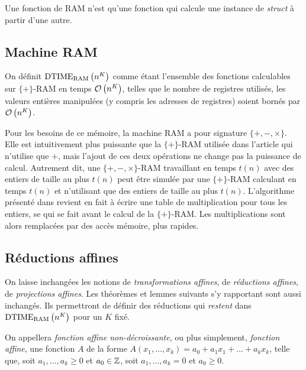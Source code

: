 		Une fonction de RAM n'est qu'une fonction qui calcule une instance de \emph{struct} à partir d'une autre. 
		
		
		
		\subsection{Machine RAM} %
		\label{subsec:machine_RAM}
		
		\begin{definition}
			\label{def:temps_poly_RAM}
			On définit $\text{DTIME}_{\text{RAM}}\left( n^K \right)$ comme étant l'ensemble des fonctions calculables sur $\{+\}$-RAM en temps $\mathcal{O}\left( n^K \right)$, telles que le nombre de registres utilisés, les valeurs entières manipulées (y compris les adresses de registres) soient bornés par $\mathcal{O}\left( n^K \right)$.
		\end{definition}
		
		Pour les besoins de ce mémoire, la machine RAM a pour signature $\{+ , -, \times \}$. Elle est intuitivement plus puissante que la $\{+\}$-RAM utilisée dans l'article \cite{Grandjean1994} qui n'utilise que $+$, mais l'ajout de ces deux opérations ne change pas la puissance de calcul. Autrement dit, une $\{+ , -, \times \}$-RAM travaillant en temps $t(n)$ avec des entiers de taille au plus $t(n)$ peut être simulée par une $\{+\}$-RAM calculant en temps $t(n)$ et n'utilisant que des entiers de taille au plus $t(n)$. 
		L'algorithme présenté dans \cite{GrandjeanSchwentick2002} revient en fait à écrire une table de multiplication pour tous les entiers, se qui se fait avant le calcul de la $\{+\}$-RAM. Les multiplications sont alors remplacées par des accès mémoire, plus rapides.
		
		
		\subsection{Réductions affines} %
		\label{subsec:reductions_affines}
		
		On laisse inchangées les notions de \emph{transformations affines}, de \emph{réductions affines}, de \emph{projections affines}. Les théorèmes et lemmes suivants s'y rapportant sont aussi inchangés. Ils permettront de définir des réductions qui \emph{restent} dans $\text{DTIME}_{\text{RAM}}\left( n^K \right)$ pour un $K$ fixé. 
		
		\begin{definition}
			On appellera \emph{fonction affine non-décroissante}, ou plus simplement, \emph{fonction affine}, une fonction $A$ de la forme $A(x_1, \dots, x_k) = a_0 + a_1 x_1 + \dots + a_k x_k$, telle que, soit $a_1, \dots, a_k \geqslant 0$ et $a_0 \in \mathbb{Z}$, soit $a_1, \dots, a_k = 0$ et $a_0 \geqslant 0$.
		\end{definition}
		
